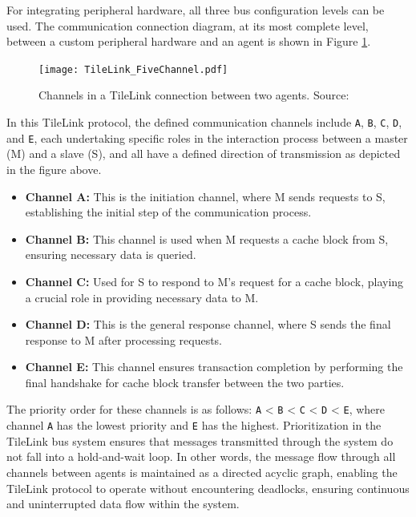 For integrating peripheral hardware, all three bus configuration levels can be used. The communication connection diagram, at its most complete level, between a custom peripheral hardware and an agent is shown in Figure \ref{fig:tilelink_channels}.

\begin{figure}[h!]
    \centering
    \texttt{[image: TileLink\_FiveChannel.pdf]}
    \caption{Channels in a TileLink connection between two agents. Source: \cite{sifive2018tilelink}}
    \label{fig:tilelink_channels}
\end{figure}

In this TileLink protocol, the defined communication channels include \texttt{A}, \texttt{B}, \texttt{C}, \texttt{D}, and \texttt{E}, each undertaking specific roles in the interaction process between a master (M) and a slave (S), and all have a defined direction of transmission as depicted in the figure above.
\begin{itemize}
    \item \textbf{Channel A:} This is the initiation channel, where M sends requests to S, establishing the initial step of the communication process.
    \item \textbf{Channel B:} This channel is used when M requests a cache block from S, ensuring necessary data is queried.
    \item \textbf{Channel C:} Used for S to respond to M's request for a cache block, playing a crucial role in providing necessary data to M.
    \item \textbf{Channel D:} This is the general response channel, where S sends the final response to M after processing requests.
    \item \textbf{Channel E:} This channel ensures transaction completion by performing the final handshake for cache block transfer between the two parties.
\end{itemize}

The priority order for these channels is as follows: \texttt{A} < \texttt{B} < \texttt{C} < \texttt{D} < \texttt{E}, where channel \texttt{A} has the lowest priority and \texttt{E} has the highest. Prioritization in the TileLink bus system ensures that messages transmitted through the system do not fall into a hold-and-wait loop. In other words, the message flow through all channels between agents is maintained as a directed acyclic graph, enabling the TileLink protocol to operate without encountering deadlocks, ensuring continuous and uninterrupted data flow within the system.

